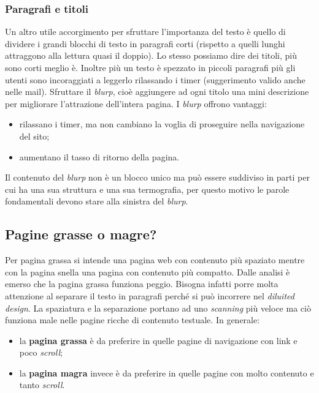 			\subsubsection{Paragrafi e titoli}
				Un altro utile accorgimento per sfruttare l'importanza del testo è quello di dividere i grandi blocchi di testo in paragrafi corti (rispetto a quelli lunghi attraggono alla lettura quasi il doppio). Lo stesso possiamo dire dei titoli, più sono corti meglio è. Inoltre più un testo è spezzato in piccoli paragrafi più gli utenti sono incoraggiati a leggerlo rilassando i timer (suggerimento valido anche nelle mail).
				Sfruttare il \emph{blurp}, cioè aggiungere ad ogni titolo una mini descrizione per migliorare l'attrazione dell'intera pagina. I \emph{blurp} offrono vantaggi:
				\begin{itemize}
					\item rilassano i timer, ma non cambiano la voglia di proseguire nella navigazione del sito;
					\item aumentano il tasso di ritorno della pagina.
				\end{itemize}
				Il contenuto del \emph{blurp} non è un blocco unico ma può essere suddiviso in parti per cui ha una sua struttura e una sua termografia, per questo motivo le parole fondamentali devono stare alla sinistra del \emph{blurp}.
			
		\subsection{Pagine grasse o magre?}
			Per pagina grassa si intende una pagina web con contenuto più spaziato mentre con la pagina snella una pagina con contenuto più compatto. Dalle analisi è emerso che la pagina grassa funziona peggio. Bisogna infatti porre molta attenzione al separare il testo in paragrafi perché si può incorrere nel \emph{diluited design}. La spaziatura e la separazione portano ad uno \emph{scanning} più veloce ma ciò funziona male nelle pagine ricche di contenuto testuale. In generale:
			\begin{itemize}
				\item la \textbf{pagina grassa} è da preferire in quelle pagine di navigazione con link e poco \emph{scroll};
				\item la \textbf{pagina magra} invece è da preferire in quelle pagine con molto contenuto e tanto \emph{scroll}.
			\end{itemize}
		
